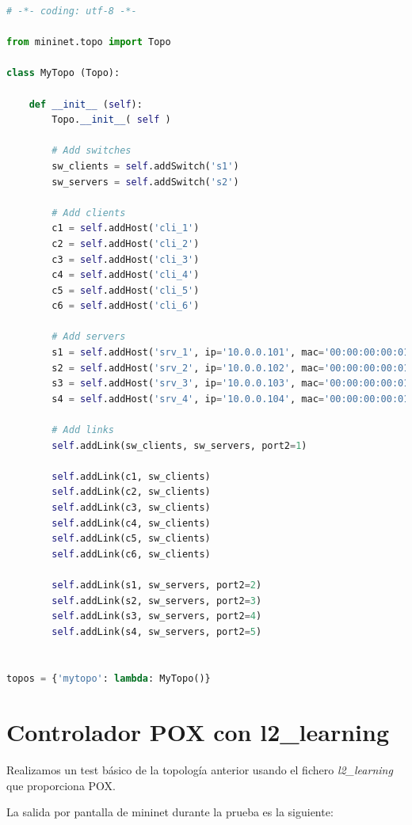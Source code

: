 \documentclass{article}
\begin{document}
\begin{lstlisting}[language=Python]
# -*- coding: utf-8 -*-

from mininet.topo import Topo

class MyTopo (Topo):

    def __init__ (self):
        Topo.__init__( self )

        # Add switches
        sw_clients = self.addSwitch('s1')
        sw_servers = self.addSwitch('s2')

        # Add clients
        c1 = self.addHost('cli_1')
        c2 = self.addHost('cli_2')
        c3 = self.addHost('cli_3')
        c4 = self.addHost('cli_4')
        c5 = self.addHost('cli_5')
        c6 = self.addHost('cli_6')

        # Add servers
        s1 = self.addHost('srv_1', ip='10.0.0.101', mac='00:00:00:00:01:01')
        s2 = self.addHost('srv_2', ip='10.0.0.102', mac='00:00:00:00:01:02')
        s3 = self.addHost('srv_3', ip='10.0.0.103', mac='00:00:00:00:01:03')
        s4 = self.addHost('srv_4', ip='10.0.0.104', mac='00:00:00:00:01:04')

        # Add links
        self.addLink(sw_clients, sw_servers, port2=1)

        self.addLink(c1, sw_clients)
        self.addLink(c2, sw_clients)
        self.addLink(c3, sw_clients)
        self.addLink(c4, sw_clients)
        self.addLink(c5, sw_clients)
        self.addLink(c6, sw_clients)

        self.addLink(s1, sw_servers, port2=2)
        self.addLink(s2, sw_servers, port2=3)
        self.addLink(s3, sw_servers, port2=4)
        self.addLink(s4, sw_servers, port2=5)


topos = {'mytopo': lambda: MyTopo()}
\end{lstlisting}

\section{Controlador POX con l2\_learning}

Realizamos un test básico de la topología anterior usando el fichero \textit{l2\_learning} que proporciona POX.

La salida por pantalla de mininet durante la prueba es la siguiente:
\end{document}

